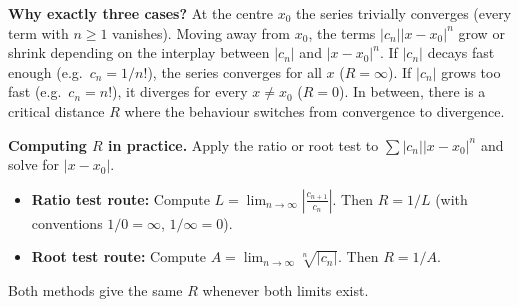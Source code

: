 \noindent\textbf{Why exactly three cases?}
At the centre $x_0$ the series trivially converges (every term with $n\ge 1$ vanishes).
Moving away from $x_0$, the terms $|c_n||x-x_0|^n$ grow or shrink depending on the interplay between $|c_n|$ and $|x-x_0|^n$.
If $|c_n|$ decays fast enough (e.g.\ $c_n=1/n!$), the series converges for all $x$ ($R=\infty$).
If $|c_n|$ grows too fast (e.g.\ $c_n=n!$), it diverges for every $x\neq x_0$ ($R=0$).
In between, there is a critical distance $R$ where the behaviour switches from convergence to divergence.

\begin{center}
\end{center}

\noindent\textbf{Computing $R$ in practice.}
Apply the ratio or root test to $\sum |c_n||x-x_0|^n$ and solve for $|x-x_0|$.
\begin{itemize}[leftmargin=*]
\item \textbf{Ratio test route:} Compute $L=\lim_{n\to\infty}\left|\frac{c_{n+1}}{c_n}\right|$. Then $R=1/L$ (with conventions $1/0=\infty$, $1/\infty=0$).
\item \textbf{Root test route:} Compute $A=\lim_{n\to\infty}\sqrt[n]{|c_n|}$. Then $R=1/A$.
\end{itemize}
Both methods give the same $R$ whenever both limits exist.

